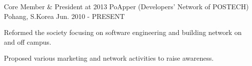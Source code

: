 \begin{cventries}

\cventry
{Core Member \& President at 2013} %
{PoApper (Developers' Network of POSTECH)} %
{Pohang, S.Korea} %
{Jun. 2010 - PRESENT} %
{ %
\begin{cvitems}
\item {Reformed the society focusing on software engineering and building network on and off campus.}
\item {Proposed various marketing and network activities to raise awareness.}
\end{cvitems}
}


\end{cventries}
